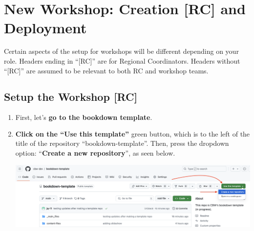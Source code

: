 \documentclass[
]{book}
\theoremstyle{definition}
\theoremstyle{definition}
\theoremstyle{definition}
\theoremstyle{definition}
\theoremstyle{remark}
\begin{document}
\chapter{\texorpdfstring{\textbf{New Workshop}: Creation {[}RC{]} and Deployment}{New Workshop: Creation {[}RC{]} and Deployment}}\label{new-workshop-create-deploy}

Certain aspects of the setup for workshops will be different depending on your role. Headers ending in ``{[}RC{]}'' are for Regional Coordinators. Headers without ``{[}RC{]}'' are assumed to be relevant to both RC and workshop teams.

\section{Setup the Workshop {[}RC{]}}\label{rc-workshop-setup}

\begin{enumerate}
\def\labelenumi{\arabic{enumi}.}
\item
  First, let's \textbf{go to the bookdown template}.
\item
  \textbf{Click on the ``Use this template''} green button, which is to the left of the title of the repository ``bookdown-template''. Then, press the dropdown option: ``\textbf{Create a new repository}'', as seen below.

  \includegraphics{img/template/make-a-template.png}\\
\end{enumerate}
\end{document}
